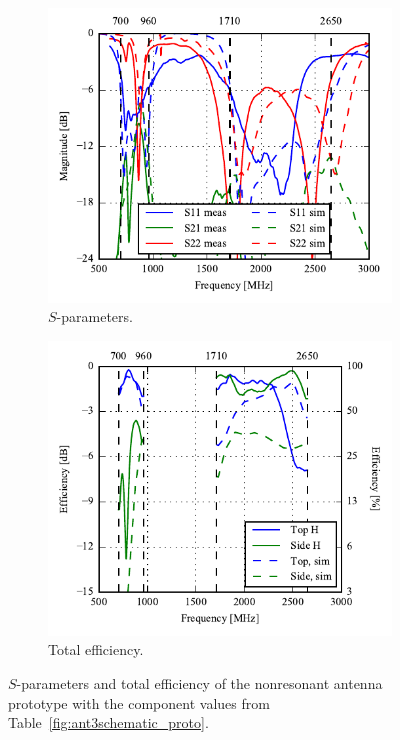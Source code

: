  \begin{figure}[htbp]
    \centering
    \begin{subfigure}{0.49\linewidth}
        \includegraphics{img/tech_sol/nonresonant/prototype/sparams.pdf}
        \caption{$S$-parameters.}
    \end{subfigure}
    \hfill
    \begin{subfigure}{0.49\linewidth}
    \includegraphics{img/tech_sol/nonresonant/prototype/eff_comp.pdf}
        \caption{Total efficiency.}
    \end{subfigure}
    \caption{$S$-parameters and total efficiency of the nonresonant antenna prototype with the component values from Table~\ref{fig:ant3schematic_proto}.}
    \label{fig:nonresonant_proto_sparam_eff}
\end{figure}

